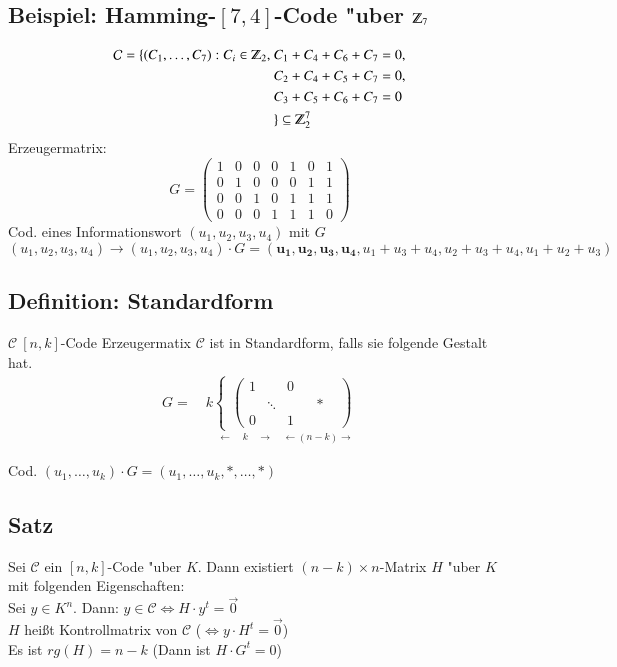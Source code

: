 \subsection{Beispiel: Hamming-$[7,4]$-Code "uber $\Z_7$}

\begin{align*}
\mathcal{C} = \lbrace (C_1,\ldots,C_7) : C_i \in \Z_2,\ &C_1 + C_4 + C_6 + C_7 = 0,\\
										&C_2 + C_4 + C_5 + C_7 = 0,\\
										&C_3 + C_5 + C_6 + C_7 = 0\\
										 &\rbrace \subseteq \Z_2^7
\end{align*}
\noindent
Erzeugermatrix:
\[	G=
	\begin{pmatrix}
		1 & 0 & 0 & 0 & 1 & 0 & 1\\
		0 & 1 & 0 & 0 & 0 & 1 & 1\\
		0 & 0 & 1 & 0 & 1 & 1 & 1\\
		0 & 0 & 0 & 1 & 1 & 1 & 0
	\end{pmatrix}
\]
Cod. eines Informationswort $(u_1,u_2,u_3,u_4)$ mit $G$
\[
	(u_1,u_2,u_3,u_4) \rightarrow (u_1,u_2,u_3,u_4) \cdot G =  (\mathbf{u_1,u_2,u_3,u_4},u_1+u_3+u_4,u_2+u_3+u_4,u_1+u_2+u_3)
\]
\subsection{Definition: Standardform}
$\mathcal{C} \  [n,k]$-Code Erzeugermatix $\mathcal{C}$ ist in Standardform, falls sie folgende Gestalt hat.
\begin{align*}
	G= \quad
	k
	\underset{\leftarrow \quad k \quad \rightarrow \quad \leftarrow (n-k) \rightarrow}{
	\begin{cases}
	\begin{pmatrix}
		1 & & 0\\
		 & \ddots & & & * & \\
		0 & & 1 & &
	\end{pmatrix}
	\end{cases}
	}
\end{align*}

Cod. $(u_1,\ldots,u_k) \cdot G = (u_1,\ldots,u_k,*,\ldots,*)$

\subsection{Satz}
Sei $\mathcal{C}$ ein $[n,k]$-Code "uber $K$. Dann existiert $(n-k)\times n$-Matrix $H$ "uber $K$ mit folgenden Eigenschaften: \\
Sei $y\in K^n$. Dann: $y \in \mathcal{C} \Leftrightarrow H \cdot y^t = \vec{0}$ 
\\
$H$ hei\ss t Kontrollmatrix von $\mathcal{C}$ ($\Leftrightarrow y \cdot H^t = \vec{0}$) \\
Es ist $rg(H)=n-k$ (Dann ist $H \cdot G^t=0$)

